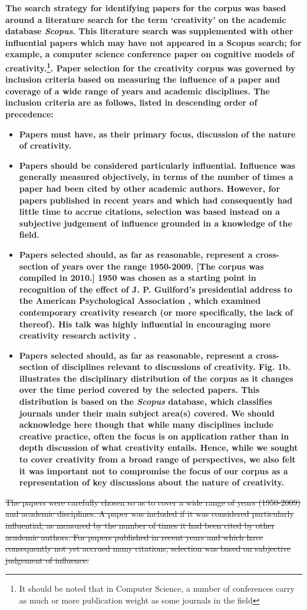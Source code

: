 \documentclass[10pt,letterpaper]{article}
\begin{document}
\textbf{The search strategy for identifying papers for the corpus was based around a literature search for the term `creativity' on the academic database {\em Scopus}. This literature search was supplemented with other influential papers which may have not appeared in a Scopus search; for example, a computer science conference paper on cognitive models of creativity.\footnote{It should be noted that in Computer Science, a number of conferences carry as much or more publication weight as some journals in the field}. Paper selection for the creativity corpus was governed by inclusion criteria based on measuring the influence of a paper and coverage of a wide range of years and academic disciplines. The inclusion criteria are as follows, listed in descending order of precedence: }
\begin{itemize}
\item \textbf{Papers must have, as their primary focus, discussion of the nature of creativity.}
\item \textbf{Papers should be considered particularly influential. Influence was generally measured objectively, in terms of the number of times a paper had been cited by other academic authors. However, for papers published in recent years and which had consequently had little time to accrue citations, selection was based instead on a subjective judgement of influence grounded in a knowledge of the field.}
\item \textbf{Papers selected should, as far as reasonable, represent a cross-section of years over the range 1950-2009. [The corpus was compiled in 2010.] 1950 was chosen as a starting point in recognition of the effect of J. P. Guilford's presidential address to the American Psychological Association \cite{guilford50}, which examined contemporary creativity research (or more specifically, the lack of thereof). His talk was highly influential in encouraging more creativity research activity \cite{kaufman09}. }
\item \textbf{Papers selected should, as far as reasonable, represent a cross-section of disciplines relevant to discussions of creativity. Fig. 1b. illustrates the disciplinary distribution of the corpus as it changes over the time period covered by the selected papers. This distribution is based on the {\em Scopus} database, which classifies journals under their main subject area(s) covered. We should acknowledge here though that while many disciplines include creative practice, often the focus is on application rather than in depth discussion of what creativity entails. Hence, while we sought to cover creativity from a broad range of perspectives, we also felt it was important not to compromise the focus of our corpus as a representation of key discussions about the nature of creativity.}
\end{itemize}
\sout{The papers were carefully chosen so as to cover a wide range of years (1950-2009) and academic disciplines. A paper was included if it was considered particularly influential, as measured by the number of times it had been cited by other academic authors. For papers published in recent years and which have consequently not yet accrued many citations, selection was based on subjective judgement of influence.}
\end{document}
